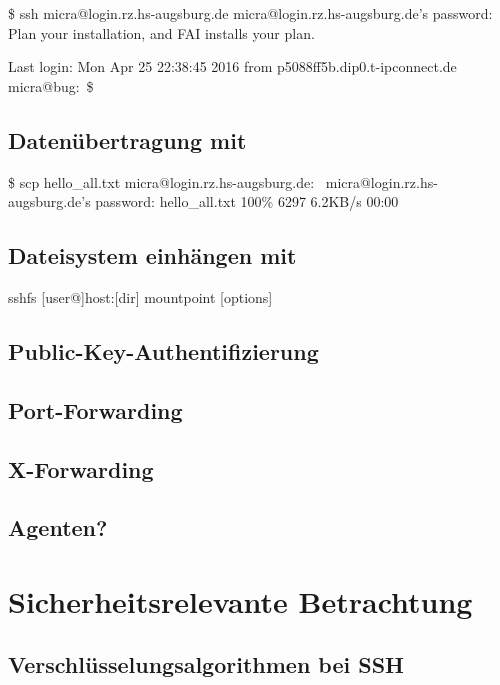 \documentclass[ngerman,pdf]{wkcms}    %
\begin{document}
\begin{program}
\$ ssh micra@login.rz.hs-augsburg.de
micra@login.rz.hs-augsburg.de's password:
Plan your installation, and FAI installs your plan.

Last login: Mon Apr 25 22:38:45 2016
from p5088ff5b.dip0.t-ipconnect.de
micra@bug:~\$

\end{program}

\subsection{Datenübertragung mit }

\begin{program}
\$ scp hello\_all.txt
micra@login.rz.hs-augsburg.de:~
micra@login.rz.hs-augsburg.de's password:
hello\_all.txt        100\% 6297     6.2KB/s   00:00
\end{program}

\subsection{Dateisystem einhängen mit }

\begin{program}
sshfs [user@]host:[dir] mountpoint [options]
\end{program}

\subsection{Public-Key-Authentifizierung}
\subsection{Port-Forwarding}
\subsection{X-Forwarding}
\subsection{Agenten?}


\section{Sicherheitsrelevante Betrachtung}
\subsection{Verschlüsselungsalgorithmen bei SSH}
\end{document}
